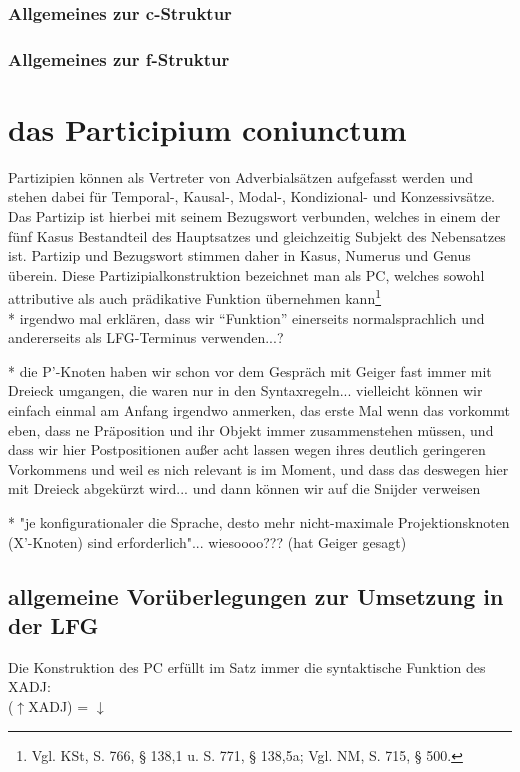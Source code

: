 \documentclass[12pt,a4paper]{article}
\begin{document}
\subsubsection{Allgemeines zur c-Struktur}
\subsubsection{Allgemeines zur f-Struktur}

\section{das Participium coniunctum}
Partizipien können als Vertreter von Adverbialsätzen aufgefasst werden und stehen dabei für Temporal-, Kausal-, Modal-, Kondizional- und Konzessivsätze. Das Partizip ist hierbei mit seinem Bezugswort verbunden, welches in einem der fünf Kasus Bestandteil des Hauptsatzes und gleichzeitig Subjekt des Nebensatzes ist. Partizip und Bezugswort stimmen daher in Kasus, Numerus und Genus überein. Diese Partizipialkonstruktion bezeichnet man als PC, welches sowohl attributive als auch prädikative Funktion übernehmen kann\footnote{Vgl. KSt, S. 766, § 138,1 u. S. 771, § 138,5a; Vgl. NM, S. 715, § 500.} \\
* irgendwo mal erklären, dass wir ``Funktion'' einerseits normalsprachlich und andererseits als LFG-Terminus verwenden...?

* die P'-Knoten haben wir schon vor dem Gespräch mit Geiger fast immer mit Dreieck umgangen, die waren nur in den Syntaxregeln... vielleicht können wir einfach einmal am Anfang irgendwo anmerken, das erste Mal wenn das vorkommt eben, dass ne Präposition und ihr Objekt immer zusammenstehen müssen, und dass wir hier Postpositionen außer acht lassen wegen ihres deutlich geringeren Vorkommens und weil es nich relevant is im Moment, und dass das deswegen hier mit Dreieck abgekürzt wird... und dann können wir auf die Snijder verweisen

* "je konfigurationaler die Sprache, desto mehr nicht-maximale Projektionsknoten (X'-Knoten) sind erforderlich"... wiesoooo??? (hat Geiger gesagt)

\subsection{allgemeine Vorüberlegungen zur Umsetzung in der LFG}
Die Konstruktion des PC erfüllt im Satz immer die syntaktische Funktion des XADJ: \\ 
($\uparrow$XADJ) = $\downarrow$ \\
\end{document}
